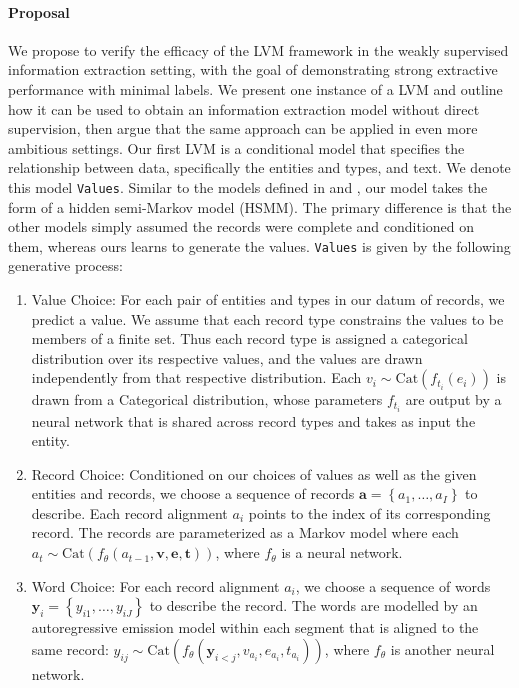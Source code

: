 \documentclass[11pt]{article}
\newcommand\set[1]{\left\{#1\right\}}
\newcommand{\Cat}{\mathrm{Cat}}
\newcommand{\ba}{\mathbf{a}}
\newcommand{\be}{\mathbf{e}}
\newcommand{\bt}{\mathbf{t}}
\newcommand{\bv}{\mathbf{v}}
\newcommand{\by}{\mathbf{y}}
\begin{document}
\paragraph{Proposal}
We propose to verify the efficacy of the LVM framework in the
weakly supervised information extraction setting,
with the goal of demonstrating strong extractive performance with minimal labels.
We present one instance of a LVM and outline how it can be used to obtain
an information extraction model without direct supervision,
then argue that the same approach can be applied in even more ambitious settings.
Our first LVM is a conditional model that specifies
the relationship between data, specifically the entities and types, and text.
We denote this model \texttt{Values}.
Similar to the models defined in \citet{wiseman2018template} and \citet{liang2009semalign},
our model takes the form of a hidden semi-Markov model (HSMM).
The primary difference is that the other models simply assumed the records
were complete and conditioned on them, whereas ours learns to generate the values.
\texttt{Values} is given by the following generative process:
\begin{enumerate}
\item Value Choice:
For each pair of entities and types in our datum of records, we predict a value.
We assume that each record type constrains the values to be members of a finite set.
Thus each record type is assigned a categorical distribution over its respective values,
and the values are drawn independently from that respective distribution.
Each $v_i\sim\Cat(f_{t_i}(e_i))$ is drawn from a Categorical distribution,
whose parameters $f_{t_i}$ are output by a neural network that is shared across record types
and takes as input the entity.
\item Record Choice:
Conditioned on our choices of values as well as the given entities and records,
we choose a sequence of records $\ba = \set{a_1,\ldots,a_I}$ to describe.
Each record alignment $a_i$ points to the index of its corresponding record.
The records are parameterized as a Markov model where each
$a_t\sim\Cat(f_\theta(a_{t-1},\bv,\be,\bt))$,
where $f_\theta$ is a neural network.
\item Word Choice:
For each record alignment $a_i$,
we choose a sequence of words $\by_i = \set{y_{i1},\ldots,y_{iJ}}$ to describe the record.
The words are modelled by an autoregressive emission model within each segment
that is aligned to the same record:
$y_{ij}\sim\Cat(f_\theta(\by_{i<j},v_{a_i},e_{a_i},t_{a_i}))$,
where $f_\theta$ is another neural network.
\end{enumerate}
\end{document}
